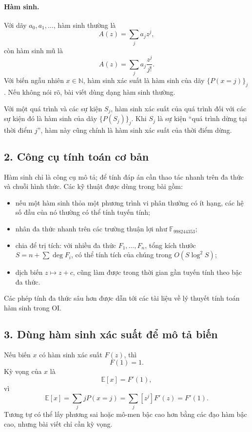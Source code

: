 \documentclass[11pt]{article}
\begin{document}
\paragraph{Hàm sinh.}
Với dãy \(a_0,a_1,\ldots\), hàm sinh thường là
\[
  A(z)=\sum_j a_jz^j,
\]
còn hàm sinh mũ là
\[
  \widehat A(z)=\sum_j a_j\frac{z^j}{j!}.
\]
Với biến ngẫu nhiên \(x\in\mathbb N\), hàm sinh xác suất là hàm sinh của dãy
\(\{P(x=j)\}_j\). Nếu không nói rõ, bài viết dùng dạng hàm sinh thường.

Với một quá trình và các sự kiện \(S_j\), hàm sinh xác suất của quá trình đối
với các sự kiện đó là hàm sinh của dãy \(\{P(S_j)\}_j\). Khi \(S_j\) là sự kiện
``quá trình dừng tại thời điểm \(j\)'', hàm này cũng chính là hàm sinh xác suất
của thời điểm dừng.

\subsection*{2. Công cụ tính toán cơ bản}

Hàm sinh chỉ là công cụ mô tả; để tính đáp án cần thao tác nhanh trên đa thức
và chuỗi hình thức. Các kỹ thuật được dùng trong bài gồm:
\begin{itemize}
  \item nếu một hàm sinh thỏa một phương trình vi phân thường có ít hạng, các
  hệ số đầu của nó thường có thể tính tuyến tính;
  \item nhân đa thức nhanh trên các trường thuận lợi như \(\mathbb F_{998244353}\);
  \item chia để trị tích: với nhiều đa thức \(F_1,\ldots,F_n\), tổng kích thước
  \(S=n+\sum\deg F_i\), có thể tính tích của chúng trong
  \(O(S\log^2 S)\);
  \item dịch biến \(z\mapsto z+c\), cũng làm được trong thời gian gần tuyến tính
  theo bậc đa thức.
\end{itemize}
Các phép tính đa thức sâu hơn được dẫn tới các tài liệu về lý thuyết tính toán
hàm sinh trong OI.

\subsection*{3. Dùng hàm sinh xác suất để mô tả biến}

Nếu biến \(x\) có hàm sinh xác suất \(F(z)\), thì
\[
  F(1)=1.
\]
Kỳ vọng của \(x\) là
\[
  \mathbb E[x]=F'(1),
\]
vì
\[
  \mathbb E[x]=\sum_j jP(x=j)=\sum_j [z^j]F'(z)=F'(1).
\]
Tương tự có thể lấy phương sai hoặc mô-men bậc cao hơn bằng các đạo hàm bậc cao,
nhưng bài viết chỉ cần kỳ vọng.
\end{document}

